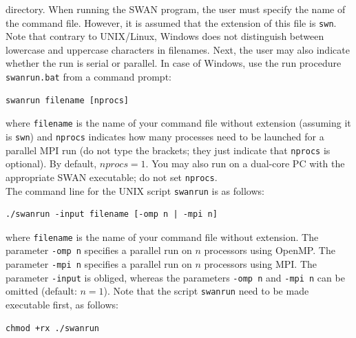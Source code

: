 \documentclass[12pt]{book}
\begin{document}
directory. When running the SWAN program, the user must specify the name of the command file.
However, it is assumed that the extension of this file is {\tt swn}. Note that contrary to
UNIX/Linux, Windows does not distinguish between lowercase and uppercase characters in filenames.
Next, the user may also indicate whether the run is serial or parallel. In case of Windows, use
the run procedure {\tt swanrun.bat} from a command prompt:
\begin{verbatim}
swanrun filename [nprocs]
\end{verbatim}
where {\tt filename} is the name of your command file without extension (assuming it is {\tt swn})
and {\tt nprocs} indicates how many processes need to be launched for a parallel MPI run (do not
type the brackets; they just indicate that {\tt nprocs} is optional). By default, $nprocs = 1$.
You may also run on a dual-core PC with the appropriate SWAN executable; do not set {\tt nprocs}.
\\[2ex]
\noindent
The command line for the UNIX script {\tt swanrun} is as follows:
\begin{verbatim}
./swanrun -input filename [-omp n | -mpi n]
\end{verbatim}
where {\tt filename} is the name of your command file without extension. The parameter {\tt -omp~n}
specifies a parallel run on $n$ processors using OpenMP. The parameter {\tt -mpi~n} specifies a
parallel run on $n$ processors using MPI. The parameter {\tt -input} is obliged, whereas the
parameters {\tt -omp~n} and {\tt -mpi~n} can be omitted (default: $n=1$). Note that the script
{\tt swanrun} need to be made executable first, as follows:
\begin{verbatim}
chmod +rx ./swanrun
\end{verbatim}
\end{document}
